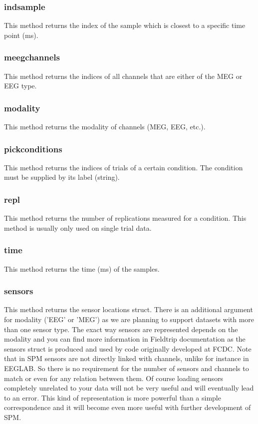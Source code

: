 \subsubsection{indsample}
This method returns the index of the sample which is closest to a
specific time point (ms).

\subsubsection{meegchannels}
This method returns the indices of all channels that are either of the
MEG or EEG type. 

\subsubsection{modality}
This method returns the modality of channels (MEG, EEG, etc.).

\subsubsection{pickconditions}
This method returns the indices of trials of a certain condition. The
condition must be supplied by its label (string).

\subsubsection{repl}
This method returns the number of replications measured for a
condition. This method is usually only used on single trial data.

\subsubsection{time}
This method returns the time (ms) of the samples.

\subsubsection{sensors}
This method returns the sensor locations struct. There is an additional argument
for modality ('EEG' or 'MEG') as we are planning to support datasets with more
than one sensor type. The exact way sensors are represented depends on the modality
and you can find more information in Fieldtrip documentation as the sensors struct is
produced and used by code originally developed at FCDC. Note that in SPM sensors are not 
directly linked with channels, unlike for instance in EEGLAB. So there is no requirement
for the number of sensors and channels to match or even for any relation between them.
Of course loading sensors completely unrelated to your data will not be very useful and will
eventually lead to an error. This kind of representation is more powerful than a
simple correspondence and it will become even more useful with further development of SPM. 


